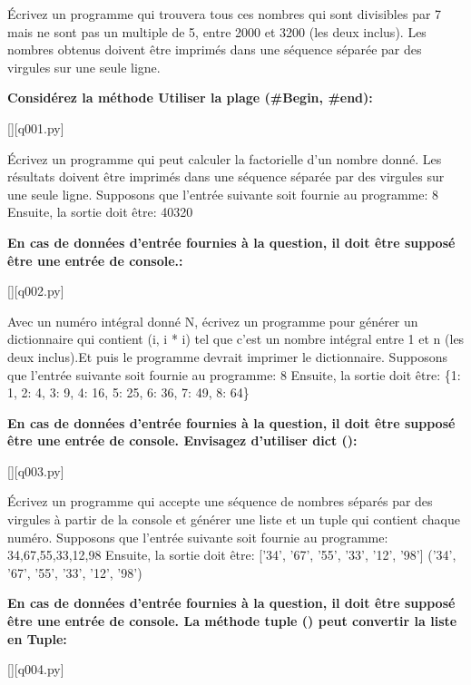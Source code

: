 
\question
Écrivez un programme qui trouvera tous ces nombres qui sont divisibles par 7 mais ne sont pas un multiple de 5,
entre 2000 et 3200 (les deux inclus).
Les nombres obtenus doivent être imprimés dans une séquence séparée par des virgules sur une seule ligne.
\par
\textbf{Considérez la méthode Utiliser la plage (\#Begin, \#end):}
\renewcommand{\nomfichier}{q001.py}
\begin{solution}
    \pythonfile{\chemincode \nomfichier}[][q001.py]
\end{solution}


\question
Écrivez un programme qui peut calculer la factorielle d'un nombre donné.
Les résultats doivent être imprimés dans une séquence séparée par des virgules sur une seule ligne.
Supposons que l'entrée suivante soit fournie au programme:
8
Ensuite, la sortie doit être:
40320
\par
\textbf{En cas de données d'entrée fournies à la question, il doit être supposé être une entrée de console.:}
\renewcommand{\nomfichier}{q002.py}
\begin{solution}
    \pythonfile{\chemincode \nomfichier}[][q002.py]
\end{solution}


\question
Avec un numéro intégral donné N, écrivez un programme pour générer un dictionnaire qui contient (i, i * i) tel que c'est un nombre intégral entre 1 et n (les deux inclus).Et puis le programme devrait imprimer le dictionnaire.
Supposons que l'entrée suivante soit fournie au programme:
8
Ensuite, la sortie doit être:
\{1: 1, 2: 4, 3: 9, 4: 16, 5: 25, 6: 36, 7: 49, 8: 64\}
\par
\textbf{En cas de données d'entrée fournies à la question, il doit être supposé être une entrée de console.
Envisagez d'utiliser dict ():}
\renewcommand{\nomfichier}{q003.py}
\begin{solution}
    \pythonfile{\chemincode \nomfichier}[][q003.py]
\end{solution}


\question
Écrivez un programme qui accepte une séquence de nombres séparés par des virgules à partir de la console et générer une liste et un tuple qui contient chaque numéro.
Supposons que l'entrée suivante soit fournie au programme:
34,67,55,33,12,98
Ensuite, la sortie doit être:
['34', '67', '55', '33', '12', '98']
('34', '67', '55', '33', '12', '98')
\par
\textbf{En cas de données d'entrée fournies à la question, il doit être supposé être une entrée de console.
La méthode tuple () peut convertir la liste en Tuple:}
\renewcommand{\nomfichier}{q004.py}
\begin{solution}
    \pythonfile{\chemincode \nomfichier}[][q004.py]
\end{solution}


